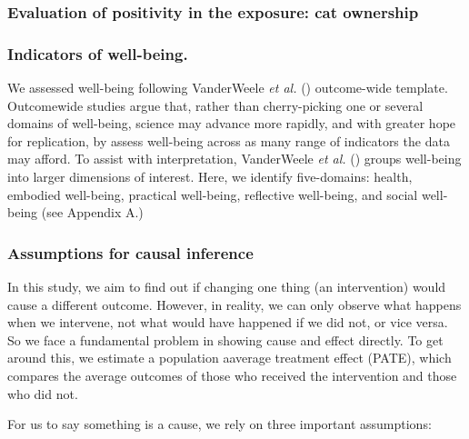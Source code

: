 \documentclass[
  singlecolumn,
  9pt]{article}
\begin{document}
\subsubsection{Evaluation of positivity in the exposure: cat
ownership}\label{evaluation-of-positivity-in-the-exposure-cat-ownership}

\subsubsection{Indicators of
well-being.}\label{indicators-of-well-being.}

We assessed well-being following VanderWeele \emph{et al.}
() outcome-wide template.
Outcomewide studies argue that, rather than cherry-picking one or
several domains of well-being, science may advance more rapidly, and
with greater hope for replication, by assess well-being across as many
range of indicators the data may afford. To assist with interpretation,
VanderWeele \emph{et al.} () groups
well-being into larger dimensions of interest. Here, we identify
five-domains: health, embodied well-being, practical well-being,
reflective well-being, and social well-being (see Appendix A.)

\subsubsection{Assumptions for causal
inference}\label{assumptions-for-causal-inference}

In this study, we aim to find out if changing one thing (an
intervention) would cause a different outcome. However, in reality, we
can only observe what happens when we intervene, not what would have
happened if we did not, or vice versa. So we face a fundamental problem
in showing cause and effect directly. To get around this, we estimate a
population aaverage treatment effect (PATE), which compares the average
outcomes of those who received the intervention and those who did not.

For us to say something is a cause, we rely on three important
assumptions:
\end{document}

